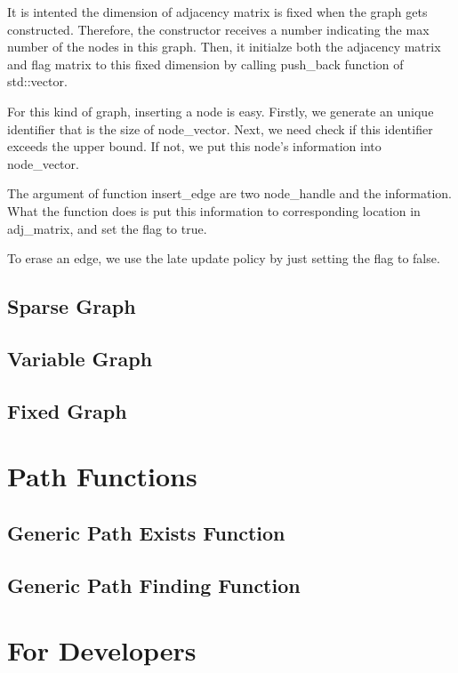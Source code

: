 \documentclass[]{article}
\begin{document}
It is intented the dimension of adjacency matrix is fixed when the graph gets constructed. Therefore, the constructor receives a number indicating the max number of the nodes in this graph. Then, it initialze both the adjacency matrix and flag matrix to this fixed dimension by calling push\_back function of std::vector.


For this kind of graph, inserting a node is easy. Firstly, we generate an unique identifier that is the size of node\_vector. Next, we need check if this identifier exceeds the upper bound. If not, we put this node's information into node\_vector.

The argument of function insert\_edge are two node\_handle and the information. What the function does is put this information to corresponding location in adj\_matrix, and set the flag to true.

To erase an edge, we use the late update policy by just setting the flag to false.



\subsection{Sparse Graph}
\subsection{Variable Graph}
\subsection{Fixed Graph}

\section{Path Functions}
\subsection{Generic Path Exists Function}
\subsection{Generic Path Finding Function}

\section{For Developers}
\end{document}
